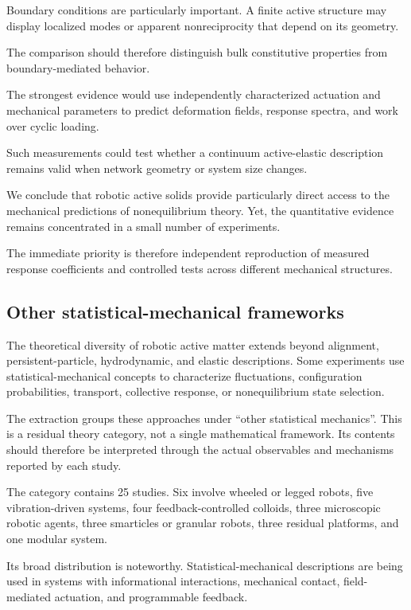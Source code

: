 Boundary conditions
are particularly
important. A finite
active structure
may display
localized modes
or apparent
nonreciprocity
that depend on
its geometry.

The comparison
should therefore
distinguish
bulk constitutive
properties from
boundary-mediated
behavior.

The strongest
evidence would
use independently
characterized
actuation and
mechanical parameters
to predict
deformation fields,
response spectra,
and work over
cyclic loading.

Such measurements
could test whether
a continuum
active-elastic
description remains
valid when network
geometry or
system size changes.

We conclude that
robotic active
solids provide
particularly direct
access to the
mechanical predictions
of nonequilibrium
theory. Yet, the
quantitative evidence
remains concentrated
in a small number
of experiments.

The immediate
priority is therefore
independent reproduction
of measured response
coefficients and
controlled tests
across different
mechanical structures.

\subsection{Other statistical-mechanical frameworks}
\label{sec:theory-statistical}

The theoretical diversity of robotic active matter
extends beyond alignment, persistent-particle,
hydrodynamic, and elastic descriptions.
Some experiments use statistical-mechanical
concepts to characterize fluctuations,
configuration probabilities, transport,
collective response, or nonequilibrium
state selection.

The extraction groups these approaches
under ``other statistical mechanics''.
This is a residual theory category,
not a single mathematical framework.
Its contents should therefore be
interpreted through the actual
observables and mechanisms
reported by each study.

The category contains 25 studies.
Six involve wheeled or legged robots,
five vibration-driven systems,
four feedback-controlled colloids,
three microscopic robotic agents,
three smarticles or granular robots,
three residual platforms,
and one modular system.

Its broad distribution is noteworthy.
Statistical-mechanical descriptions
are being used in systems with
informational interactions,
mechanical contact,
field-mediated actuation,
and programmable feedback.

